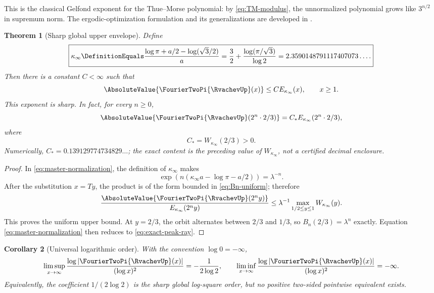 \documentclass[11pt,oneside]{article}
\numberwithin{equation}{section}
\newtheorem{theorem}{Theorem}[section]
\newtheorem{corollary}[theorem]{Corollary}
\theoremstyle{definition}
\theoremstyle{remark}
\begin{document}
This is the classical Gelfond exponent for the Thue--Morse polynomial: by
\eqref{eq:TM-modulus}, the unnormalized polynomial grows like $3^{n/2}$ in supremum norm.
The ergodic-optimization formulation and its generalizations are developed in
\cite{fan-schmeling-shen}.

\begin{theorem}[Sharp global upper envelope]
\label{thm:uniform-envelope}
Define
\begin{equation}
 \boxed{\displaystyle
 \kappa_\infty
 \DefinitionEquals\frac{\log\pi+a/2-\log(\sqrt3/2)}{a}
 =\frac32+\frac{\log(\pi/\sqrt3)}{\log2}
 =2.3590148791117407073\ldots .}
 \label{eq:kappa-infty}
\end{equation}
Then there is a constant $C<\infty$ such that
\begin{equation}
 \AbsoluteValue{\FourierTwoPi{\RvachevUp}(x)}\le C E_{\kappa_\infty}(x),
 \qquad x\ge1.
 \label{eq:uniform-envelope}
\end{equation}
This exponent is sharp.  In fact, for every $n\ge0$,
\begin{equation}
 \AbsoluteValue{\FourierTwoPi{\RvachevUp}(2^n\cdot2/3)}
 =C_*E_{\kappa_\infty}(2^n\cdot2/3),
 \label{eq:exact-peak-ray}
\end{equation}
where
\begin{equation}
 C_*=W_{\kappa_\infty}(2/3)>0.
 \label{eq:Cstar}
\end{equation}
Numerically, $C_*=0.139129774734829\ldots$; the exact content is the preceding value of
$W_{\kappa_\infty}$, not a certified decimal enclosure.
\end{theorem}

\begin{proof}
In \eqref{eq:master-normalization}, the definition of $\kappa_\infty$ makes
\[
 \exp(n(\kappa_\infty a-\log\pi-a/2))=\lambda^{-n}.
\]
After the substitution $x=Ty$, the product is of the form bounded in
\eqref{eq:Bn-uniform}; therefore
\[
 \frac{\AbsoluteValue{\FourierTwoPi{\RvachevUp}(2^ny)}}{E_{\kappa_\infty}(2^ny)}
 \le\lambda^{-1}\max_{1/2\le y\le1}W_{\kappa_\infty}(y).
\]
This proves the uniform upper bound.  At $y=2/3$, the orbit alternates between $2/3$ and
$1/3$, so $B_n(2/3)=\lambda^n$ exactly.  Equation
\eqref{eq:master-normalization} then reduces to \eqref{eq:exact-peak-ray}.
\end{proof}

\begin{corollary}[Universal logarithmic order]
\label{cor:universal-log-order}
With the convention $\log0=-\infty$,
\begin{equation}
 \limsup_{x\to\infty}\frac{\log|\FourierTwoPi{\RvachevUp}(x)|}{(\log x)^2}
 =-\frac1{2\log2},
 \qquad
 \liminf_{x\to\infty}\frac{\log|\FourierTwoPi{\RvachevUp}(x)|}{(\log x)^2}=-\infty.
 \label{eq:universal-log-order}
\end{equation}
Equivalently, the coefficient $1/(2\log2)$ is the sharp global log-square order, but no
positive two-sided pointwise equivalent exists.
\end{corollary}
\end{document}
